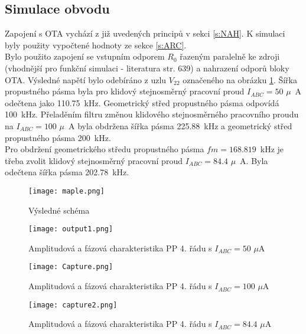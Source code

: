 \subsection{Simulace obvodu}
\noindent  Zapojení s OTA vychází z již uvedených principů v sekci \ref{s:NAH}. K simulaci byly použity vypočtené hodnoty ze sekce \ref{s:ARC}. \\
\noindent Bylo použito zapojení se vstupním odporem $R_0$ řazeným paralelně ke zdroji (vhodnější pro funkční simulaci - literatura \cite{18} str. 639) a nahrazení odporů bloky OTA. Výsledné napětí bylo odebíráno z uzlu $V_{22}$ označeného na obrázku \ref{s:V1}. Šířka propustného pásma byla pro klidový stejnosměrný pracovní proud $I_{ABC} = 50$ $\mu$~A odečtena jako 110.75~kHz. Geometrický střed propustného pásma odpovídá 100~kHz. Přeladěním filtru změnou klidového stejnosměrného pracovního proudu na $I_{ABC} = 100$ $\mu$~A byla obdržena šířka pásma 225.88~kHz a geometrický střed propustného pásma 200~kHz. \\
Pro obdržení geometrického středu propustného pásma $fm = 168.819$~kHz je třeba zvolit klidový stejnosměrný pracovní proud $I_{ABC} = 84.4$ $\mu$~A. Byla odečtena šířka pásma 202.78~kHz. 
\begin{figure}[h]
\centering
\texttt{[image: maple.png]}
\caption{Výsledné schéma\label{s:V1}}
\end{figure}
\begin{figure}[h]
\centering
\texttt{[image: output1.png]}
\caption{Amplitudová a fázová charakteristika PP 4. řádu s $I_{ABC} = 50$ $\mu$A}
\end{figure}
\begin{figure}[h]
\centering
\texttt{[image: Capture.png]}
\caption{Amplitudová a fázová charakteristika PP 4. řádu s $I_{ABC} = 100$ $\mu$A}
\end{figure}
\begin{figure}[h]
\centering
\texttt{[image: capture2.png]}
\caption{Amplitudová a fázová charakteristika PP 4. řádu s $I_{ABC} = 84.4$ $\mu$A}
\end{figure}
